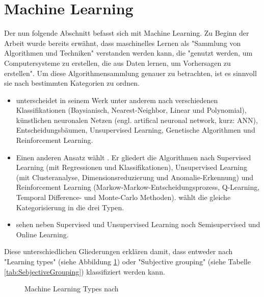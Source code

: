 \section{Machine Learning}\label{sec:MachineLearning}
Der nun folgende Abschnitt befasst sich mit Machine Learning. Zu Beginn der Arbeit wurde bereits erwähnt, dass maschinelles Lernen als "Sammlung von Algorithmen und Techniken" verstanden werden kann, die "genutzt werden, um Computersysteme zu erstellen, die aus Daten lernen, um Vorhersagen zu erstellen".\citep[S.~53; eigene Übersetzung]{swamynathan_mastering_2017} Um diese Algorithmensammlung genauer zu betrachten, ist es sinnvoll sie nach bestimmten Kategorien zu ordnen. 
\begin{itemize}
\item \citep{kubat_introduction_2017} unterscheidet in seinem Werk unter anderem nach verschiedenen Klassifikationen (Baysianisch, Nearest-Neighbor, Linear und Polynomial), künstlichen neuronalen Netzen (engl. artifical neuronal network, kurz: ANN), Entscheidungsbäumen, Unsupervised Learning, Genetische Algorithmen und Reinforcement Learning.
\item Einen anderen Ansatz wählt \citep{swamynathan_mastering_2017}. Er gliedert die Algorithmen nach Supervised Learning (mit Regressionen und Klassifikationen), Unsupervised Learning (mit Clusteranalyse, Dimensionsreduzierung und Anomalie-Erkennung) und Reinforcement Learning (Markow-Markow-Entscheidungsprozess, Q-Learning, Temporal Difference- und Monte-Carlo Methoden). \citep{kim_matlab_2017} wählt die gleiche Kategorisierung in die drei Typen.
\item \citep{paluszek_matlab_2017} sehen neben Supervised und Unsupervised Learning noch Semisupervised und Online Learning.
\end{itemize}
Diese unterschiedlichen Gliederungen erklären \citep[S.~222]{ramasubramanian_machine_2017} damit, dass entweder nach "Learning types" (siehe Abbildung \ref{fig:MachineLearningTypes_all}) oder "Subjective grouping" (siehe Tabelle \ref{tab:SebjectiveGrouping}) klassifiziert werden kann.
\begin{figure}[H]
\centering
{}
\caption{Machine Learning Types nach  \citep[S.~222]{ramasubramanian_machine_2017}}
\label{fig:MachineLearningTypes_all}
\end{figure}

